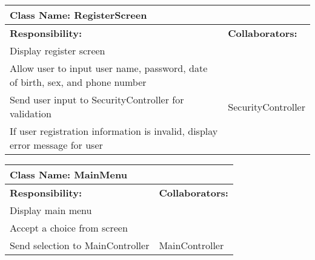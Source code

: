 \documentclass[english]{article}
\begin{document}
    \begin{table}[!ht]
        \centering
        \begin{tabular}{|p{8cm}|p{4cm}|}
        \hline 
        \multicolumn{2}{|l|}{\textbf{Class Name: RegisterScreen}} \\
        \hline
        \textbf{Responsibility:} & \textbf{Collaborators:} \\
        \hline
        Display register screen &  \\
        \hline
        Allow user to input user name, password, date of birth, sex, and phone number & \\
        \hline
        Send user input to SecurityController for validation & SecurityController\\
        \hline 
        If user registration information is invalid, display error message for user & \\
        \hline
        \end{tabular}
    \end{table}
    
    \begin{table}[!ht]
        \centering
        \begin{tabular}{|p{8cm}|p{4cm}|}
        \hline 
        \multicolumn{2}{|l|}{\textbf{Class Name: MainMenu}} \\
        \hline
        \textbf{Responsibility:} & \textbf{Collaborators:} \\
        \hline
        Display main menu & \\
        \hline
        Accept a choice from screen & \\
        \hline
        Send selection to MainController & MainController \\
        \hline
        \end{tabular}
    \end{table}
    
\end{document}
